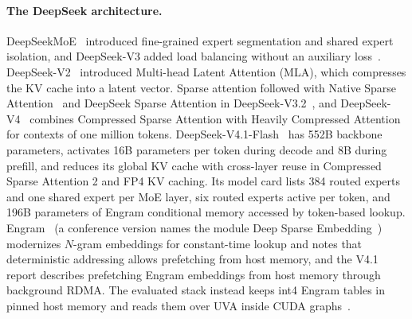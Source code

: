 \paragraph{The DeepSeek architecture.}
DeepSeekMoE~\citep{dai2024deepseekmoe} introduced fine-grained expert segmentation and shared expert isolation, and
DeepSeek-V3 added load balancing without an auxiliary loss~\citep{wang2024auxlossfree,deepseekai2024v3}.
DeepSeek-V2~\citep{deepseekai2024v2} introduced Multi-head Latent Attention (MLA), which compresses the KV cache into a
latent vector. Sparse attention followed with Native Sparse Attention~\citep{yuan2025nsa} and DeepSeek Sparse Attention
in DeepSeek-V3.2~\citep{deepseekai2025v32,deepseekai2025v32exp}, and DeepSeek-V4~\citep{deepseekai2026v4} combines
Compressed Sparse Attention with Heavily Compressed Attention for contexts of one million tokens.
DeepSeek-V4.1-Flash~\citep{deepseekai2026v41flash,deepseekai2026v41flashcard} has 552B backbone parameters, activates
16B parameters per token during decode and 8B during prefill, and reduces its global KV cache with cross-layer reuse in
Compressed Sparse Attention 2 and FP4 KV caching. Its model card lists 384 routed experts and one shared expert per MoE
layer, six routed experts active per token, and 196B parameters of Engram conditional memory accessed by token-based
lookup. Engram~\citep{cheng2026engram} (a conference version names the module Deep Sparse
Embedding~\citep{cheng2026dse}) modernizes $N$-gram embeddings for constant-time lookup and notes that deterministic
addressing allows prefetching from host memory, and the V4.1 report describes prefetching Engram embeddings from host
memory through background RDMA. The evaluated stack instead keeps int4 Engram tables in pinned host memory and reads
them over UVA inside CUDA graphs~\citep{diffbot2026dsv41exl3}.

